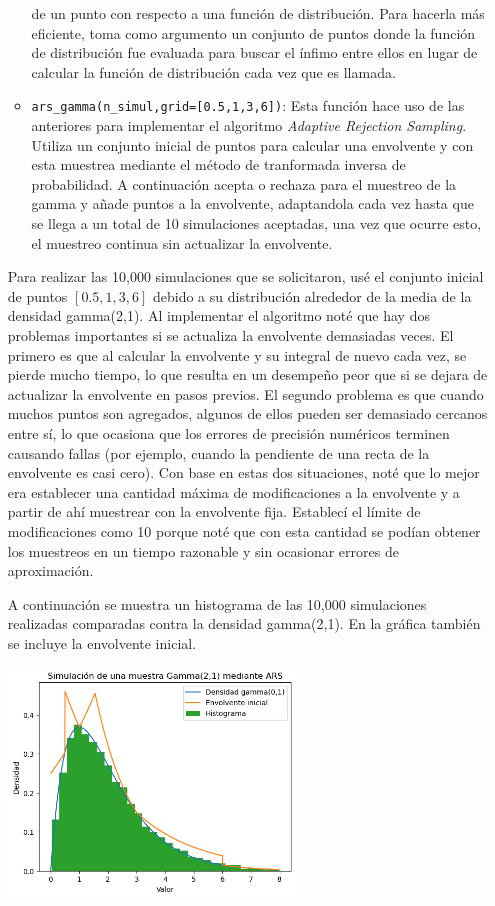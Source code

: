 \documentclass{article}
\begin{document}
\begin{enumerate}
\begin{itemize}
        de un punto con respecto a una función de distribución. Para hacerla más eficiente, toma como argumento
        un conjunto de puntos donde la función de distribución fue evaluada para buscar el ínfimo entre
        ellos en lugar de calcular la función de distribución cada vez que es llamada.
        \item \texttt{ars\_gamma(n\_simul,grid=[0.5,1,3,6])}: Esta función hace uso de las anteriores para
        implementar el algoritmo \textit{Adaptive Rejection Sampling}. Utiliza un conjunto inicial de puntos
        para calcular una envolvente y con esta muestrea mediante el método de tranformada inversa de probabilidad.
        A continuación acepta o rechaza para el muestreo de la gamma y añade puntos a la envolvente, adaptandola
        cada vez hasta que se llega a un total de 10 simulaciones aceptadas, una vez que ocurre esto, el muestreo
        continua sin actualizar la envolvente.
    \end{itemize}

    Para realizar las 10,000 simulaciones que se solicitaron, usé el conjunto inicial de puntos 
    $[0.5,1,3,6]$ debido a su distribución alrededor de la media de la densidad gamma(2,1). Al 
    implementar el algoritmo noté que hay dos problemas importantes si se actualiza la envolvente 
    demasiadas veces. El primero es que al calcular la envolvente y su integral de nuevo cada vez,
    se pierde mucho tiempo, lo que resulta en un desempeño peor que si se dejara de actualizar la
    envolvente en pasos previos. El segundo problema es que cuando muchos puntos son agregados, 
    algunos de ellos pueden ser demasiado cercanos entre sí, lo que ocasiona que los errores de 
    precisión numéricos terminen causando fallas (por ejemplo, cuando la pendiente de una recta de 
    la envolvente es casi cero). Con base en estas dos situaciones, noté que lo mejor era establecer
    una cantidad máxima de modificaciones a la envolvente y a partir de ahí muestrear con la envolvente
    fija. Establecí el límite de modificaciones como 10 porque noté que con esta cantidad se podían
    obtener los muestreos en un tiempo razonable y sin ocasionar errores de aproximación.

    A continuación se muestra un histograma de las 10,000 simulaciones realizadas comparadas
    contra la densidad gamma(2,1). En la gráfica también se incluye la envolvente inicial.

    \begin{center}
        \includegraphics[width=0.6\textwidth]{hist_gamma_env.png}
    \end{center}


\end{enumerate}
\end{document}
